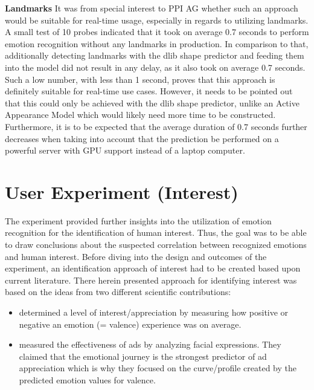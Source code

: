 \textbf{Landmarks}\newline
It was from special interest to PPI AG whether such an approach would be suitable for real-time usage, especially in regards to utilizing landmarks. 
\newline\newline
A small test of 10 probes indicated that it took on average 0.7 seconds to perform emotion recognition without any landmarks in production. In comparison to that, additionally detecting landmarks with the dlib shape predictor \citep{Kazemi:2014:ShapePredictor} and feeding them into the model did not result in any delay, as it also took on average 0.7 seconds. Such a low number, with less than 1 second, proves that this approach is definitely suitable for real-time use cases. 
\newline\newline
However, it needs to be pointed out that this could only be achieved with the dlib shape predictor, unlike an Active Appearance Model which would likely need more time to be constructed. Furthermore, it is to be expected that the average duration of 0.7 seconds further decreases when taking into account that the prediction be performed on a powerful server with GPU support instead of a laptop computer.

\section{User Experiment (Interest)}
The experiment provided further insights into the utilization of emotion recognition for the identification of human interest. Thus, the goal was to be able to draw conclusions about the suspected correlation between recognized emotions and human interest. Before diving into the design and outcomes of the experiment, an identification approach of interest had to be created based upon current literature.
\newline\newline
There herein presented approach for identifying interest was based on the ideas from two different scientific contributions:
\begin{itemize}
    \item \citet{Kamaruddin:2016:MeasuringCustomerSatisfaction} determined a level of interest/appreciation by measuring how positive or negative an emotion (= valence) experience was on average.
    \item \citet{Poirier:2016:AdsFacialExpression} measured the effectiveness of ads by analyzing facial expressions. They claimed that the emotional journey is the strongest predictor of ad appreciation which is why they focused on the curve/profile created by the predicted emotion values for valence.
\end{itemize}


